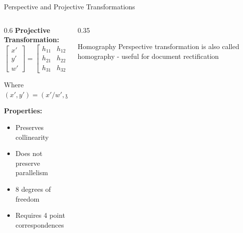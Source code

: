 \documentclass[aspectratio=169,10pt]{beamer}
\begin{document}
\begin{frame}{Perspective and Projective Transformations}
    \begin{columns}[T]
        \begin{column}{0.6\textwidth}
            \textbf{Projective Transformation:}
            $$\begin{bmatrix} x' \\ y' \\ w' \end{bmatrix} =
            \begin{bmatrix}
            h_{11} & h_{12} & h_{13} \\
            h_{21} & h_{22} & h_{23} \\
            h_{31} & h_{32} & h_{33}
            \end{bmatrix}
            \begin{bmatrix} x \\ y \\ 1 \end{bmatrix}$$

            Where $(x', y') = (x'/w', y'/w')$

            \textbf{Properties:}
            \begin{itemize}
                \item Preserves collinearity
                \item Does not preserve parallelism
                \item 8 degrees of freedom
                \item Requires 4 point correspondences
            \end{itemize}
        \end{column}
        \begin{column}{0.35\textwidth}
            \begin{insight}{Homography}{}
                Perspective transformation is also called homography - useful for document rectification
            \end{insight}
        \end{column}
    \end{columns}
\end{frame}
\end{document}
